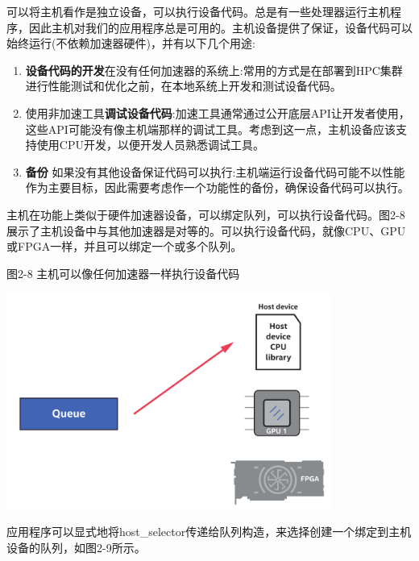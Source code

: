 可以将主机看作是独立设备，可以执行设备代码。总是有一些处理器运行主机程序，因此主机对我们的应用程序总是可用的。主机设备提供了保证，设备代码可以始终运行(不依赖加速器硬件)，并有以下几个用途:\par

\begin{enumerate}
	\item \textbf{设备代码的开发}在没有任何加速器的系统上:常用的方式是在部署到HPC集群进行性能测试和优化之前，在本地系统上开发和测试设备代码。
	\item 使用非加速工具\textbf{调试设备代码}:加速工具通常通过公开底层API让开发者使用，这些API可能没有像主机端那样的调试工具。考虑到这一点，主机设备应该支持使用CPU开发，以便开发人员熟悉调试工具。
	\item \textbf{备份} 如果没有其他设备保证代码可以执行:主机端运行设备代码可能不以性能作为主要目标，因此需要考虑作一个功能性的备份，确保设备代码可以执行。
\end{enumerate}

主机在功能上类似于硬件加速器设备，可以绑定队列，可以执行设备代码。图2-8展示了主机设备中与其他加速器是对等的。可以执行设备代码，就像CPU、GPU或FPGA一样，并且可以绑定一个或多个队列。\par

\hspace*{\fill} \par %
图2-8 主机可以像任何加速器一样执行设备代码
\begin{center}
	\includegraphics[width=0.8\textwidth]{content/chapter-2/images/6}
\end{center}

应用程序可以显式地将host\_selector传递给队列构造，来选择创建一个绑定到主机设备的队列，如图2-9所示。\par

